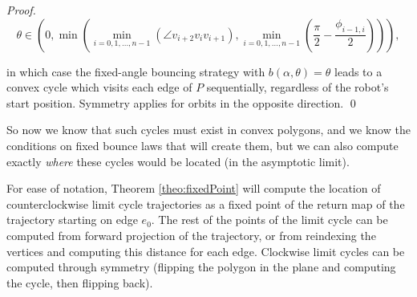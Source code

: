 \documentclass[sageh,times,Review]{sagej}
\begin{document}
\begin{proof}
\begin{equation*}
\theta \in (0, \min(\min_{i = 0, 1, \dots, n-1}(\angle v_{i+2}v_{i}v_{i+1}),
\min_{i = 0, 1, \dots, n-1}(\frac{\pi}{2}-\frac{\phi_{i-1, i}}{2}))),
\end{equation*}

\noindent
in which case the fixed-angle bouncing strategy with $b(\alpha, \theta) = \theta$ leads to a convex
cycle which visits each edge of $P$ sequentially, regardless of the robot's start position.
Symmetry applies for orbits in the opposite direction. \qed
\end{proof}

So now we know that such cycles must exist in convex polygons, and we know the 
conditions on fixed bounce laws that will create them, but we can also compute
exactly {\em where} these cycles would be located (in the asymptotic limit).

For ease of notation, Theorem \ref{theo:fixedPoint} will compute the location of
counterclockwise limit cycle trajectories as a fixed point of the return map of the trajectory
starting on edge $e_0$. The rest of the points of the limit cycle can
be computed from forward projection of the trajectory, or from reindexing the
vertices and computing this distance for each edge. Clockwise limit cycles can
be computed through symmetry (flipping the polygon in the plane and computing
the cycle, then flipping back).
\end{document}
